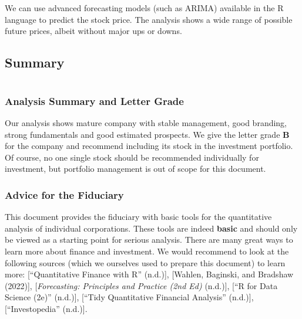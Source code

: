\documentclass[
  letterpaper,
  DIV=11,
  numbers=noendperiod]{scrartcl}
\begin{document}
We can use advanced forecasting models (such as ARIMA) available in the
R language to predict the stock price. The analysis shows a wide range
of possible future prices, albeit without major ups or downs.

\subsection{Summary}\label{summary}

\section{}\label{section-7}

\subsubsection{\texorpdfstring{\textbf{Analysis Summary and Letter
Grade}}{Analysis Summary and Letter Grade}}\label{analysis-summary-and-letter-grade}

Our analysis shows mature company with stable management, good branding,
strong fundamentals and good estimated prospects. We give the letter
grade \textbf{B} for the company and recommend including its stock in
the investment portfolio. Of course, no one single stock should be
recommended individually for investment, but portfolio management is out
of scope for this document.

\subsubsection{\texorpdfstring{\textbf{Advice for the
Fiduciary}}{Advice for the Fiduciary}}\label{advice-for-the-fiduciary}

This document provides the fiduciary with basic tools for the
quantitative analysis of individual corporations. These tools are indeed
\textbf{basic} and should only be viewed as a starting point for serious
analysis. There are many great ways to learn more about finance and
investment. We would recommend to look at the following sources (which
we ourselves used to prepare this document) to learn more:
{[}{``Quantitative Finance with {R}''} (n.d.){]}, {[}Wahlen, Baginski,
and Bradshaw (2022){]}, {[}\emph{Forecasting: {Principles} and
{Practice} (2nd Ed)} (n.d.){]}, {[}{``R for {Data Science} (2e)''}
(n.d.){]}, {[}{``Tidy {Quantitative Financial Analysis}''} (n.d.){]},
{[}{``Investopedia''} (n.d.){]}.
\end{document}
